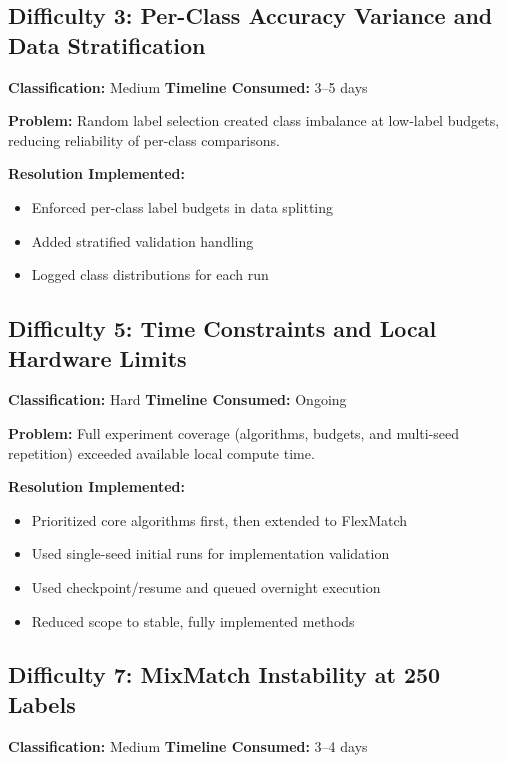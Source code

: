 \subsection{Difficulty 3: Per-Class Accuracy Variance and Data Stratification}

\textbf{Classification:} Medium \quad \textbf{Timeline Consumed:} 3--5 days

\textbf{Problem:}
Random label selection created class imbalance at low-label budgets, reducing reliability of per-class comparisons.

\textbf{Resolution Implemented:}

\begin{itemize}
    \item Enforced per-class label budgets in data splitting
    \item Added stratified validation handling
    \item Logged class distributions for each run
\end{itemize}

\subsection{Difficulty 5: Time Constraints and Local Hardware Limits}

\textbf{Classification:} Hard \quad \textbf{Timeline Consumed:} Ongoing

\textbf{Problem:}
Full experiment coverage (algorithms, budgets, and multi-seed repetition) exceeded available local compute time.

\textbf{Resolution Implemented:}

\begin{itemize}
    \item Prioritized core algorithms first, then extended to FlexMatch
    \item Used single-seed initial runs for implementation validation
    \item Used checkpoint/resume and queued overnight execution
    \item Reduced scope to stable, fully implemented methods
\end{itemize}

\subsection{Difficulty 7: MixMatch Instability at 250 Labels}

\textbf{Classification:} Medium \quad \textbf{Timeline Consumed:} 3--4 days

